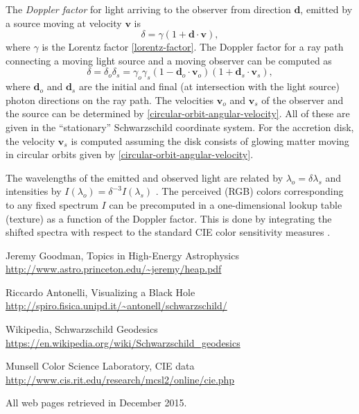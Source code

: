 \documentclass[a4paper,12pt]{article}
\def\mb{\boldsymbol}
\begin{document}
The \emph{Doppler factor} for light arriving to the observer from direction $\mb d$, emitted by a source moving at velocity $\mb v$ is \cite{astro-princeton}
\begin{equation}\label{doppler-factor-moving-source}
  \delta = \gamma (1 + \mb d \cdot \mb v),
\end{equation}
where $\gamma$ is the Lorentz factor \eqref{lorentz-factor}.
The Doppler factor for a ray path connecting a moving light source and a moving observer can be computed as
$$
 \delta = \delta_o \delta_s = \gamma_o \gamma_s (1 - \mb d_o \cdot \mb v_o)(1 + \mb d_s \cdot \mb v_s),
$$
where $\mb d_o$ and $\mb d_s$ are the initial and final (at intersection with the light source) photon directions on the ray path. The velocities $\mb v_o$ and $\mb v_s$ of the observer and the source can be determined by \eqref{circular-orbit-angular-velocity}. All of these are given in the ``stationary'' Schwarzschild coordinate system.
For the accretion disk, the velocity $\mb v_s$ is computed assuming the disk consists of glowing matter moving in circular orbits given by \eqref{circular-orbit-angular-velocity}.

The wavelengths of the emitted and observed light are related by $\lambda_o = \delta \lambda_s$ and intensities by $I(\lambda_o) = \delta^{-3} I(\lambda_s)$ \cite{astro-princeton}.
The perceived (RGB) colors corresponding to any fixed spectrum $I$ can be precomputed in a one-dimensional lookup table (texture) as a function of the Doppler factor. This is done by integrating the shifted spectra with respect to the standard CIE color sensitivity measures \cite{cie:data}.

\clearpage
\begin{thebibliography}{9}

 Jeremy Goodman, Topics in High-Energy Astrophysics
\newblock \url{http://www.astro.princeton.edu/~jeremy/heap.pdf}

 Riccardo Antonelli, Visualizing a Black Hole
\newblock \url{http://spiro.fisica.unipd.it/~antonell/schwarzschild/}

 Wikipedia, Schwarzschild Geodesics
\newblock \url{https://en.wikipedia.org/wiki/Schwarzschild_geodesics}

 Munsell Color Science Laboratory, CIE data
\newblock \url{http://www.cis.rit.edu/research/mcsl2/online/cie.php}


\end{thebibliography}

\noindent
All web pages retrieved in December 2015.
\end{document}
